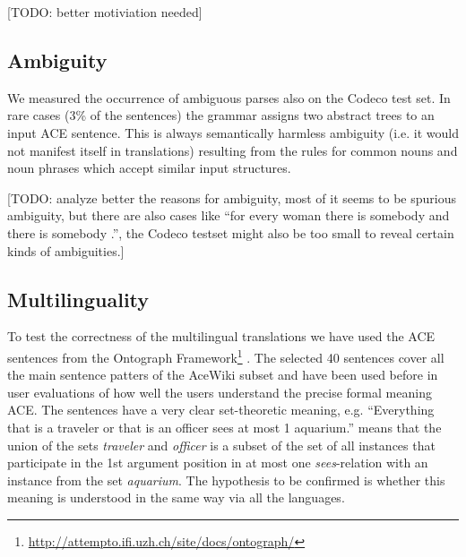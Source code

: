 \documentclass[a4paper]{article}
\begin{document}
[TODO: better motiviation needed]




\subsection{Ambiguity}

We measured the occurrence of ambiguous parses also on the Codeco test set.
In rare cases (3\% of the sentences) the grammar assigns two abstract trees
to an input ACE sentence. This is always semantically harmless ambiguity
(i.e. it would not manifest itself in translations) resulting from the rules
for common nouns and noun phrases which accept similar input structures.

[TODO: analyze better the reasons for ambiguity,
most of it seems to be spurious ambiguity,
but there are also cases like
``for every  woman  there is  somebody  and  there is  somebody  .'',
the Codeco testset might also be too small to reveal certain kinds of
ambiguities.]


\subsection{Multilinguality}

To test the correctness of the multilingual translations we have used
the ACE sentences from the
Ontograph
Framework\footnote{\url{http://attempto.ifi.uzh.ch/site/docs/ontograph/}}
\cite{kuhn2009cnlmain}. The selected 40 sentences cover all the main sentence
patters of the AceWiki subset and have been used before in user
evaluations of how well the users understand the precise formal meaning ACE.
The sentences have a very clear set-theoretic meaning, e.g.
``Everything that is a traveler or that is an officer sees
at most 1 aquarium.'' means that the union of the sets \emph{traveler} and
\emph{officer} is a subset of the set of all instances that participate in
the 1st argument position in at most one \emph{sees}-relation with an
instance from the set \emph{aquarium}.
The hypothesis to be confirmed is whether this meaning is understood in
the same way via all the languages.
\end{document}

